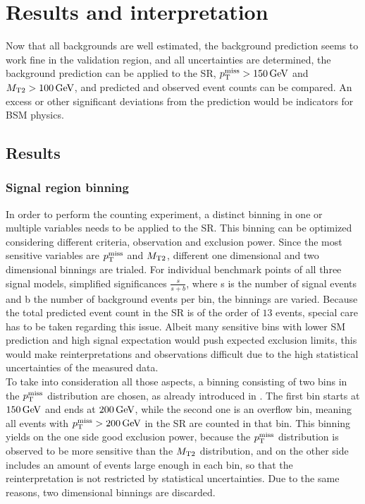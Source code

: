 \chapter{Results and interpretation}\label{chap:results}
Now that all backgrounds are well estimated, the background prediction seems to work fine in the validation region, and all uncertainties are determined, the background prediction can be applied to the SR, $p_{\mathrm{T}}^\text{miss}>150\,\text{Ge\hspace{-.08em}V}$ and $M_{\mathrm{T2}}>100\,\text{Ge\hspace{-.08em}V}$, and predicted and observed event counts can be compared. An excess or other significant deviations from the prediction would be indicators for BSM physics.
\section{Results}\label{sec:results}
\subsection*{Signal region binning}
In order to perform the counting experiment, a distinct binning in one or multiple variables needs to be applied to the SR. This binning can be optimized considering different criteria, \eg observation and exclusion power. Since the most sensitive variables are $p_{\mathrm{T}}^\text{miss}$ and $M_{\mathrm{T2}}$, different one dimensional and two dimensional binnings are trialed. For individual benchmark points of all three signal models, simplified significances $\frac{s}{s+b}$, where s is the number of signal events and b the number of background events per bin, the binnings are varied. Because the total predicted event count in the SR is of the order of $13$ events, special care has to be taken regarding this issue. Albeit many sensitive bins with lower SM prediction and high signal expectation would push expected exclusion limits, this would make reinterpretations and observations difficult due to the high statistical uncertainties of the measured data.\\
To take into consideration all those aspects, a binning consisting of two bins in the $p_{\mathrm{T}}^\text{miss}$ distribution are chosen, as already introduced in . The first bin starts at $150\,\text{Ge\hspace{-.08em}V}$ and ends at $200\,\text{Ge\hspace{-.08em}V}$, while the second one is an overflow bin, meaning all events with $p_{\mathrm{T}}^\text{miss}>200\,\text{Ge\hspace{-.08em}V}$ in the SR are counted in that bin. This binning yields on the one side good exclusion power, because the $p_{\mathrm{T}}^\text{miss}$ distribution is observed to be more sensitive than the $M_{\mathrm{T2}}$ distribution, and on the other side includes an amount of events large enough in each bin, so that the reinterpretation is not restricted by statistical uncertainties. Due to the same reasons, two dimensional binnings are discarded.
